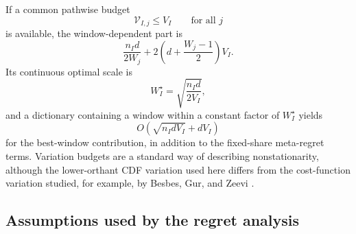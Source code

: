 \documentclass[11pt]{article}
\newcommand{\1}{\mathbf{1}}
\begin{document}
If a common pathwise budget
\[
    \mathcal V_{I,j}\le V_I
    \qquad
    \text{for all }j
\]
is available, the window-dependent part is
\[
    \frac{n_Id}{2W_j}
    +
    2
    \left(
        d+\frac{W_j-1}{2}
    \right)V_I.
\]
Its continuous optimal scale is
\[
    W_I^\star
    =
    \sqrt{\frac{n_Id}{2V_I}},
\]
and a dictionary containing a window within a constant factor of
$W_I^\star$ yields
\[
\boxed{
    O\!\left(
        \sqrt{n_IdV_I}
        +
        dV_I
    \right)
}
\]
for the best-window contribution, in addition to the fixed-share
meta-regret terms.  Variation budgets are a standard way of describing
nonstationarity, although the lower-orthant CDF variation used here differs
from the cost-function variation studied, for example, by
Besbes, Gur, and Zeevi \cite{besbes2015}.

\subsection*{Assumptions used by the regret analysis}
\end{document}
